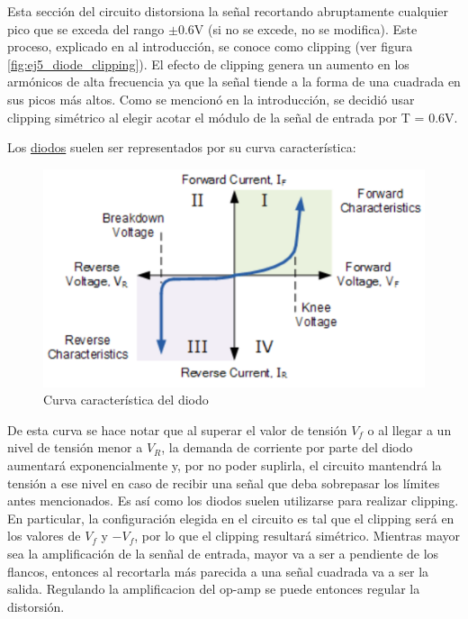 \documentclass[../../main.tex]{subfiles}
\begin{document}
Esta secci\'on del circuito distorsiona la se\~nal recortando abruptamente cualquier pico que se exceda del rango $\pm$0.6V (si no se excede, no se modifica). Este proceso, explicado en al introducción, se conoce como clipping (ver figura \ref{fig:ej5_diode_clipping}).
El efecto de clipping genera un aumento en los arm\'onicos de alta frecuencia ya que la se\~nal tiende a la forma de una cuadrada en sus picos más altos. Como se mencionó en la introducción, se decidi\'o usar clipping sim\'etrico al elegir acotar el módulo de la señal de entrada por T = 0.6V.

Los \underline{diodos} suelen ser representados por su curva característica:

\begin{figure}[H]	%
	\centering
	\includegraphics[scale=0.5]{imagenes/diode_curva.png}
	\caption{Curva característica del diodo}
	\label{fig:ej5_diode_curva}
\end{figure}

De esta curva se hace notar que al superar el valor de tensión $V_f$ o al llegar a un nivel de tensión menor a $V_R$, la demanda de corriente por parte del diodo aumentará exponencialmente y, por no poder suplirla, el circuito mantendrá la tensión a ese nivel en caso de recibir una señal que deba sobrepasar los límites antes mencionados. Es así como los diodos suelen utilizarse para realizar clipping. En particular, la configuración elegida en el circuito es tal que el clipping será en los valores de $V_f$ y $-V_f$, por lo que el clipping resultará simétrico. Mientras mayor sea la amplificaci\'on de la sen\~nal de entrada, mayor va a ser a pendiente de los flancos, entonces al recortarla m\'as parecida a una se\~nal cuadrada va a ser la salida. Regulando la amplificacion del op-amp se puede entonces regular la distorsi\'on.
\end{document}
